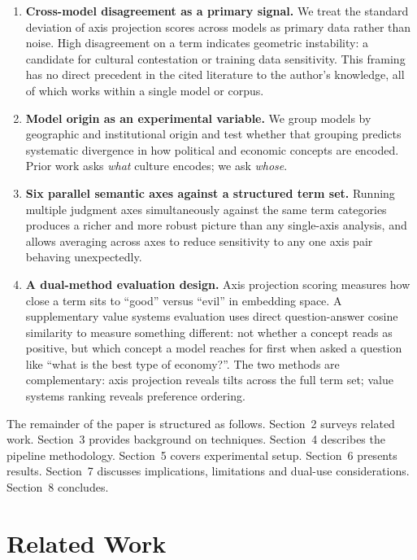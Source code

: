 \documentclass[11pt, letterpaper]{article}
\begin{document}
\begin{enumerate}
  \item \textbf{Cross-model disagreement as a primary signal.} We treat the standard deviation of axis projection scores across models as primary data rather than noise. High disagreement on a term indicates geometric instability: a candidate for cultural contestation or training data sensitivity. This framing has no direct precedent in the cited literature to the author's knowledge, all of which works within a single model or corpus.

  \item \textbf{Model origin as an experimental variable.} We group models by geographic and institutional origin and test whether that grouping predicts systematic divergence in how political and economic concepts are encoded. Prior work asks \textit{what} culture encodes; we ask \textit{whose}.

  \item \textbf{Six parallel semantic axes against a structured term set.} Running multiple judgment axes simultaneously against the same term categories produces a richer and more robust picture than any single-axis analysis, and allows averaging across axes to reduce sensitivity to any one axis pair behaving unexpectedly.

  \item \textbf{A dual-method evaluation design.} Axis projection scoring measures how close a term sits to ``good'' versus ``evil'' in embedding space. A supplementary value systems evaluation uses direct question-answer cosine similarity to measure something different: not whether a concept reads as positive, but which concept a model reaches for first when asked a question like ``what is the best type of economy?''. The two methods are complementary: axis projection reveals tilts across the full term set; value systems ranking reveals preference ordering.

\end{enumerate}

The remainder of the paper is structured as follows. Section~2 surveys related work. Section~3 provides background on techniques. Section~4 describes the pipeline methodology. Section~5 covers experimental setup. Section~6 presents results. Section~7 discusses implications, limitations and dual-use considerations. Section~8 concludes.

\section{Related Work}
\end{document}
